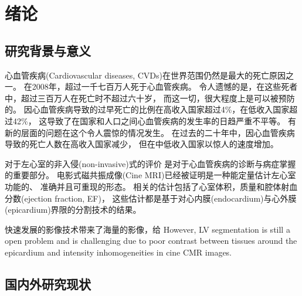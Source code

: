 
\chapter{绪论}


\section{研究背景与意义}

心血管疾病(Cardiovascular diseases, CVDs)在世界范围仍然是最大的死亡原因之一。
在2008年，超过一千七百万人死于心血管疾病。
令人遗憾的是，在这些死者中，超过三百万人在死亡时不超过六十岁，
而这一切，很大程度上是可以被预防的。
因心血管疾病导致的过早死亡的比例在高收入国家超过4\%，在低收入国家超过42\%，
这导致了在国家和人口之间心血管疾病的发生率的日趋严重不平等。
有新的层面的问题在这个令人震惊的情况发生。
在过去的二十年中，因心血管疾病导致的死亡人数在高收入国家减少，
但在中低收入国家以惊人的速度增加。

对于左心室的非入侵(non-invasive)式的评价
是对于心血管疾病的诊断与病症掌握的重要部分。
电影式磁共振成像(Cine MRI)已经被证明是一种能定量估计左心室功能的、
准确并且可重现的形态。
相关的估计包括了心室体积，质量和腔体射血分数(ejection fraction, EF)，
这些估计都是基于对心内膜(endocardium)与心外膜(epicardium)界限的分割技术的结果。

快速发展的影像技术带来了海量的影像，给
However, LV segmentation is still a open problem and is challenging due to poor
contrast between tissues around the epicardium and intensity inhomogeneities
in cine CMR images.

\section{国内外研究现状}



